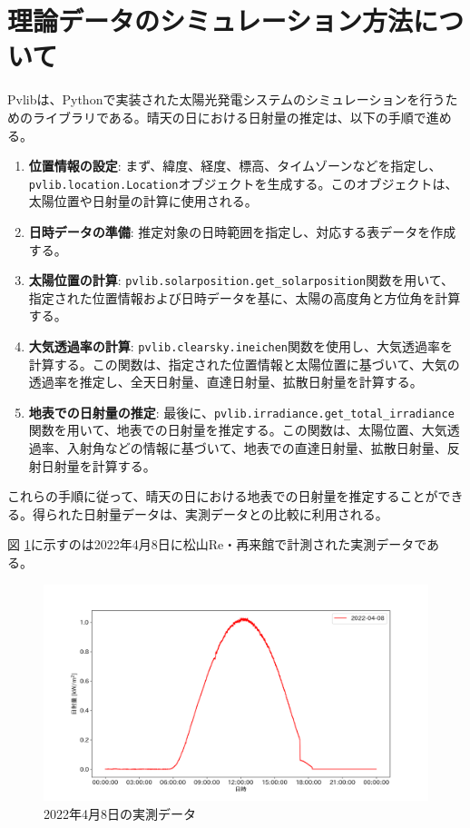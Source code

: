 \documentclass[a4j,12pt,]{jarticle}
\begin{document}
\section{理論データのシミュレーション方法について}
Pvlibは、Pythonで実装された太陽光発電システムのシミュレーションを行うためのライブラリである。晴天の日における日射量の推定は、以下の手順で進める。

\begin{enumerate}
\item \textbf{位置情報の設定}: まず、緯度、経度、標高、タイムゾーンなどを指定し、\\\texttt{pvlib.location.Location}オブジェクトを生成する。このオブジェクトは、太陽位置や日射量の計算に使用される。
\item \textbf{日時データの準備}: 推定対象の日時範囲を指定し、対応する表データを作成する。
\item \textbf{太陽位置の計算}: \texttt{pvlib.solarposition.get\_solarposition}関数を用いて、指定された位置情報および日時データを基に、太陽の高度角と方位角を計算する。
\item \textbf{大気透過率の計算}: \texttt{pvlib.clearsky.ineichen}関数を使用し、大気透過率を計算する。この関数は、指定された位置情報と太陽位置に基づいて、大気の透過率を推定し、全天日射量、直達日射量、拡散日射量を計算する。
\item \textbf{地表での日射量の推定}: 最後に、\texttt{pvlib.irradiance.get\_total\_irradiance}関数を用いて、地表での日射量を推定する。この関数は、太陽位置、大気透過率、入射角などの情報に基づいて、地表での直達日射量、拡散日射量、反射日射量を計算する。
\end{enumerate}

これらの手順に従って、晴天の日における地表での日射量を推定することができる。得られた日射量データは、実測データとの比較に利用される。

図 \ref{p2}に示すのは2022年4月8日に松山Re・再来館で計測された実測データである。

\begin{figure}[H]
  \begin{center}
    \includegraphics[width=160mm]{real.png}
    \caption{2022年4月8日の実測データ}
    \label{p2}
  \end{center}
\end{figure}
\end{document}

